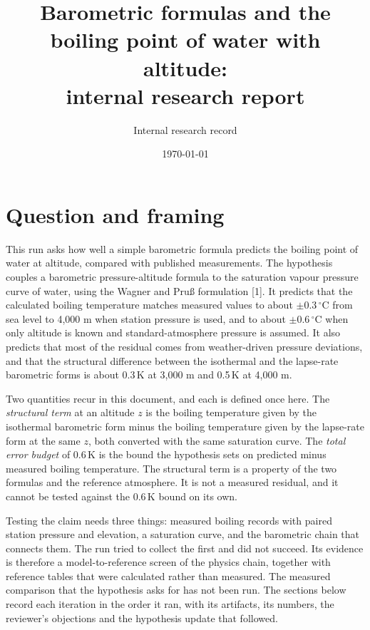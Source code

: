 \documentclass[11pt,letterpaper]{article}
\title{Barometric formulas and the boiling point of water with altitude:\\internal research report}
\author{Internal research record}
\date{\today}
\begin{document}
\maketitle
\tableofcontents

\section{Question and framing}

This run asks how well a simple barometric formula predicts the boiling point of water at altitude, compared with published measurements. The hypothesis couples a barometric pressure-altitude formula to the saturation vapour pressure curve of water, using the Wagner and Pru\ss{} formulation [1]. It predicts that the calculated boiling temperature matches measured values to about $\pm 0.3$\,$^\circ$C from sea level to 4,000 m when station pressure is used, and to about $\pm 0.6$\,$^\circ$C when only altitude is known and standard-atmosphere pressure is assumed. It also predicts that most of the residual comes from weather-driven pressure deviations, and that the structural difference between the isothermal and the lapse-rate barometric forms is about 0.3\,K at 3,000 m and 0.5\,K at 4,000 m.

Two quantities recur in this document, and each is defined once here. The \emph{structural term} at an altitude $z$ is the boiling temperature given by the isothermal barometric form minus the boiling temperature given by the lapse-rate form at the same $z$, both converted with the same saturation curve. The \emph{total error budget} of 0.6\,K is the bound the hypothesis sets on predicted minus measured boiling temperature. The structural term is a property of the two formulas and the reference atmosphere. It is not a measured residual, and it cannot be tested against the 0.6\,K bound on its own.

Testing the claim needs three things: measured boiling records with paired station pressure and elevation, a saturation curve, and the barometric chain that connects them. The run tried to collect the first and did not succeed. Its evidence is therefore a model-to-reference screen of the physics chain, together with reference tables that were calculated rather than measured. The measured comparison that the hypothesis asks for has not been run. The sections below record each iteration in the order it ran, with its artifacts, its numbers, the reviewer's objections and the hypothesis update that followed.
\end{document}
